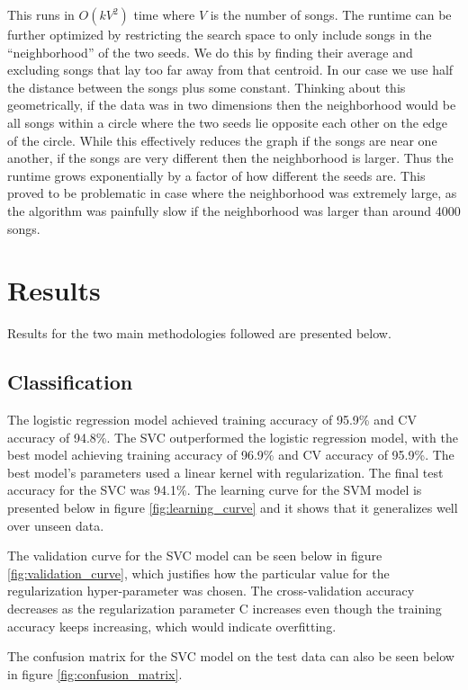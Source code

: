 \documentclass[acmtog]{acmart}
\begin{document}
This runs in $O(kV^2)$ time where $V$ is the number of songs. The runtime can be further optimized by restricting the search space to only include songs in the ``neighborhood'' of the two seeds. We do this by finding their average and excluding songs that lay too far away from that centroid. In our case we use half the distance between the songs plus some constant. Thinking about this geometrically, if the data was in two dimensions then the neighborhood would be all songs within a circle where the two seeds lie opposite each other on the edge of the circle. While this effectively reduces the graph if the songs are near one another, if the songs are very different then the neighborhood is larger. Thus the runtime grows exponentially by a factor of how different the seeds are. This proved to be problematic in case where the neighborhood was extremely large, as the algorithm was painfully slow if the neighborhood was larger than around 4000 songs.

\section{Results}

Results for the two main methodologies followed are presented below.

\subsection{Classification}
The logistic regression model achieved training accuracy of 95.9\% and CV accuracy of 94.8\%. The SVC outperformed the logistic regression model, with the best model achieving training accuracy of 96.9\% and CV accuracy of 95.9\%. The best model's parameters used a linear kernel with regularization. The final test accuracy for the SVC was 94.1\%.
The learning curve for the SVM model is presented below in figure \ref{fig:learning_curve} and it shows that it generalizes well over unseen data.
\newline

The validation curve for the SVC model can be seen below in figure \ref{fig:validation_curve}, which justifies how the particular value for the regularization hyper-parameter was chosen. The cross-validation accuracy decreases as the regularization parameter C increases even though the training accuracy keeps increasing, which would indicate overfitting.

The confusion matrix for the SVC model on the test data can also be seen below in figure \ref{fig:confusion_matrix}.
\end{document}
